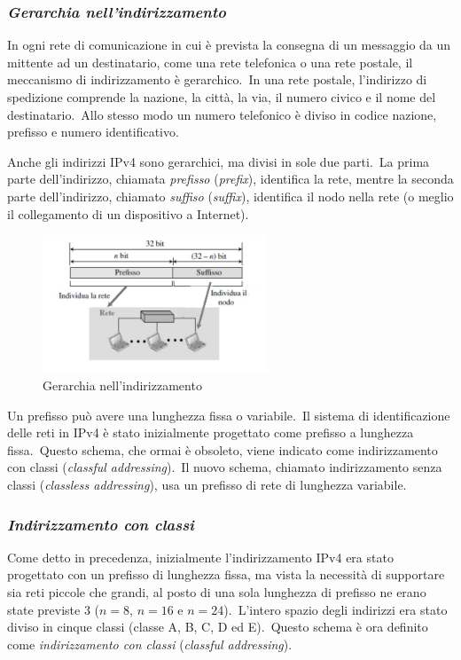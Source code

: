 \subsubsection{\emph{Gerarchia nell'indirizzamento}}

In ogni rete di comunicazione in cui è prevista la consegna di un messaggio da un mittente ad un destinatario, come una rete telefonica o una rete postale, il meccanismo di indirizzamento è gerarchico.\
In una rete postale, l'indirizzo di spedizione comprende la nazione, la città, la via, il numero civico e il nome del destinatario.\
Allo stesso modo un numero telefonico è diviso in codice nazione, prefisso e numero identificativo.

Anche gli indirizzi IPv4 sono gerarchici, ma divisi in sole due parti.\
La prima parte dell'indirizzo, chiamata \emph{prefisso} (\emph{prefix}), identifica la rete, mentre la seconda parte dell'indirizzo, chiamato \emph{suffiso} (\emph{suffix}), identifica il nodo nella rete (o meglio il collegamento di un dispositivo a Internet).

\begin{figure}[H]
    \centering
    \includegraphics[width=0.6\textwidth]{immagini/prefissi_suffissi.jpg}
    \caption*{Gerarchia nell'indirizzamento}
\end{figure}

Un prefisso può avere una lunghezza fissa o variabile.\
Il sistema di identificazione delle reti in IPv4 è stato inizialmente progettato come prefisso a lunghezza fissa.\
Questo schema, che ormai è obsoleto, viene indicato come indirizzamento con classi (\emph{classful addressing}).\
Il nuovo schema, chiamato indirizzamento senza classi (\emph{classless addressing}), usa un prefisso di rete di lunghezza variabile.

\subsubsection{\emph{Indirizzamento con classi}}

Come detto in precedenza, inizialmente l'indirizzamento IPv4 era stato progettato con un prefisso di lunghezza fissa, ma vista la necessità di supportare sia reti piccole che grandi, al posto di una sola lunghezza di prefisso ne erano state previste 3 ($n =8$, $ n=16 $ e $n=24 $).\
L'intero spazio degli indirizzi era stato diviso in cinque classi (classe A, B, C, D ed E).\
Questo schema è ora definito come \emph{indirizzamento con classi} (\emph{classful addressing}).

